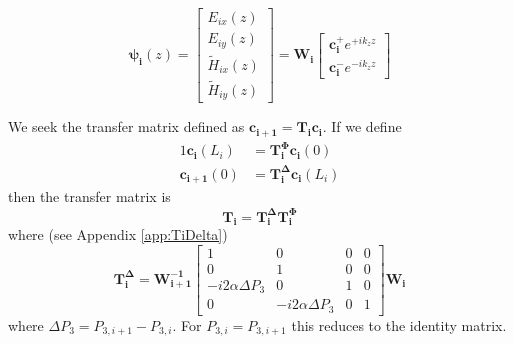 \documentclass[notitlepage,nofootinbib]{revtex4-1}
\renewcommand{\vec}[1]{\mathbf{#1}}
\begin{document}
\begin{equation}
	\boldsymbol{\psi_i}(z)=
	\begin{bmatrix}
		E_{ix}(z) \\
		E_{iy}(z) \\
		\tilde{H}_{ix}(z) \\
		\tilde{H}_{iy}(z)
	\end{bmatrix}
	=
	\vec{W_i} \begin{bmatrix}
		\vec{c_i^+} e^{+ i k_z z} \\
		\vec{c_i^-} e^{- i k_z z}
	\end{bmatrix}
\end{equation}

We seek the transfer matrix defined as $ \vec{c_{i+1}} = \vec{T_i} \vec{c_i} $. If we define
\begin{alignat}{1}
	\vec{c_i}(L_i) &= \vec{T_i^\Phi} \vec{c_i}(0) \\
	\vec{c_{i+1}}(0) &= \vec{T_i^\Delta} \vec{c_i}(L_i)
\end{alignat}
then the transfer matrix is
\begin{equation}
	\vec{T_i} = \vec{T_i^\Delta} \vec{T_i^\Phi}
\end{equation}
where (see Appendix \ref{app:TiDelta})
\begin{equation}
	\vec{T_i^\Delta}
	=
	\vec{W_{i+1}^{-1}}
	\begin{bmatrix}
		1 & 0 & 0 & 0 \\
		0 & 1 & 0 & 0 \\
		-i2\alpha \Delta P_3 & 0 & 1 & 0 \\
		0 & -i2\alpha \Delta P_3 & 0 & 1
	\end{bmatrix}
	\vec{W_i}
\end{equation}
where $ \Delta P_3 = P_{3,i+1} - P_{3,i} $. For $ P_{3,i} = P_{3,i+1} $ this reduces to the identity matrix.
\end{document}
